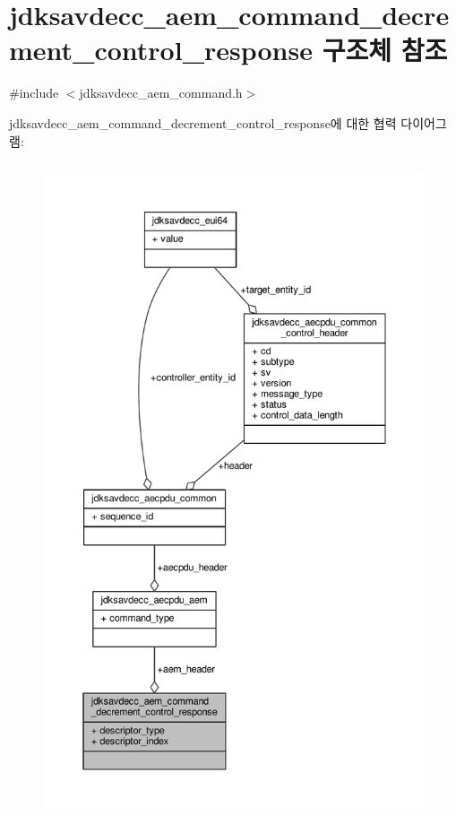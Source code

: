 \hypertarget{structjdksavdecc__aem__command__decrement__control__response}{}\section{jdksavdecc\+\_\+aem\+\_\+command\+\_\+decrement\+\_\+control\+\_\+response 구조체 참조}
\label{structjdksavdecc__aem__command__decrement__control__response}


{\ttfamily \#include $<$jdksavdecc\+\_\+aem\+\_\+command.\+h$>$}



jdksavdecc\+\_\+aem\+\_\+command\+\_\+decrement\+\_\+control\+\_\+response에 대한 협력 다이어그램\+:
\nopagebreak
\begin{figure}[H]
\begin{center}
\leavevmode
\includegraphics[height=550pt]{structjdksavdecc__aem__command__decrement__control__response__coll__graph}
\end{center}
\end{figure}
